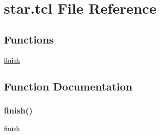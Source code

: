 \hypertarget{star_8tcl}{}\section{star.\+tcl File Reference}
\label{star_8tcl}
\subsection*{Functions}
\begin{DoxyCompactItemize}
\item 
\hyperlink{star_8tcl_a30728837c246b65ef76298af0101d99c}{finish}
\end{DoxyCompactItemize}


\subsection{Function Documentation}
\mbox{\label{star_8tcl_a30728837c246b65ef76298af0101d99c}} 
\subsubsection{\texorpdfstring{finish()}{finish()}}
{\footnotesize\ttfamily finish}

